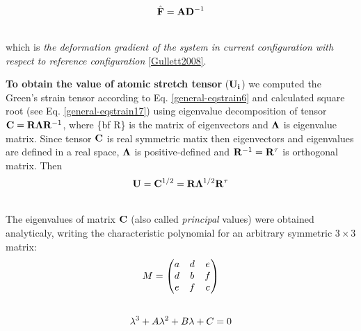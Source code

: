 \documentclass[letterpaper,10pt,english]{sphinxmanual}
\begin{document}
\label{general:equation-defgradnum}\begin{gather}
\begin{split}\hat{\bf F} = {\bf A} {\bf D}^{-1}\end{split}\label{general-defgradnum}\\\begin{split}\end{split}\notag
\end{gather}
which is \emph{the deformation gradient of the system in current configuration with respect to reference configuration} {\hyperref[general:gullett2008]{{[}Gullett2008{]}}}.

\textbf{To obtain the value of atomic stretch tensor} (${\bf U_i}$) we computed the Green's strain tensor according to Eq. \eqref{general-eqstrain6} and calculated square root (see Eq. \eqref{general-eqstrain17}) using eigenvalue decomposition of tensor ${\bf C}={\bf R} {\bf \Lambda} {\bf R}^{-1}$, where \{bf R\} is the matrix of eigenvectors and ${\bf \Lambda}$ is eigenvalue matrix. Since tensor ${\bf C}$ is real symmetric matix then eigenvectors and eigenvalues are defined in a real space, ${\bf \Lambda}$ is positive-defined and ${\bf R}^{-1}={\bf R}^{\tau}$ is orthogonal matrix. Then
\label{general:equation-eqstrain21}\begin{gather}
\begin{split}{\bf U} = {\bf C}^{1/2} = {\bf R} {\bf \Lambda}^{1/2} {\bf R}^{\tau}\end{split}\label{general-eqstrain21}\\\begin{split}\end{split}\notag
\end{gather}
The eigenvalues of matrix ${\bf C}$ (also  called \emph{principal} values) were obtained analyticaly, writing the characteristic polynomial for an arbitrary symmetric $3 \times 3$ matrix:
\begin{gather}
\begin{split}M = \begin{pmatrix}
a & d & e \\
d & b & f \\
e & f & c
\end{pmatrix}\end{split}\notag\\\begin{split}\end{split}\notag
\end{gather}\label{general:equation-eqstrain20}\begin{gather}
\begin{split}\lambda ^{3} + A \lambda ^{2} + B \lambda + C = 0\end{split}\label{general-eqstrain20}\\\begin{split}\end{split}\notag
\end{gather}
\end{document}
